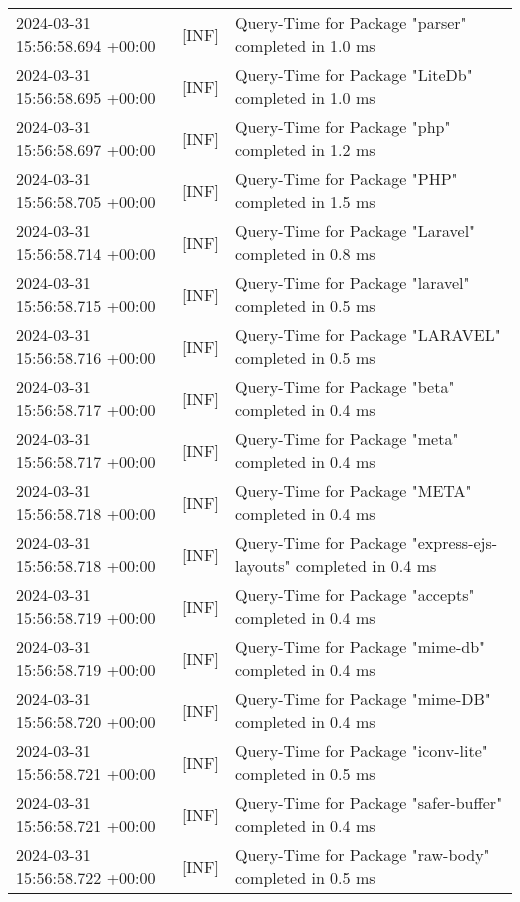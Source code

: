 {{\begin{tabularx}{\textwidth}{|l|l|X|}
                    2024-03-31 15:56:58.694 +00:00 & [INF] & Query-Time for Package "parser" completed in 1.0 ms \\
                    2024-03-31 15:56:58.695 +00:00 & [INF] & Query-Time for Package "LiteDb" completed in 1.0 ms \\
                    2024-03-31 15:56:58.697 +00:00 & [INF] & Query-Time for Package "php" completed in 1.2 ms \\
                    2024-03-31 15:56:58.705 +00:00 & [INF] & Query-Time for Package "PHP" completed in 1.5 ms \\
                    2024-03-31 15:56:58.714 +00:00 & [INF] & Query-Time for Package "Laravel" completed in 0.8 ms \\
                    2024-03-31 15:56:58.715 +00:00 & [INF] & Query-Time for Package "laravel" completed in 0.5 ms \\
                    2024-03-31 15:56:58.716 +00:00 & [INF] & Query-Time for Package "LARAVEL" completed in 0.5 ms \\
                    2024-03-31 15:56:58.717 +00:00 & [INF] & Query-Time for Package "beta" completed in 0.4 ms \\
                    2024-03-31 15:56:58.717 +00:00 & [INF] & Query-Time for Package "meta" completed in 0.4 ms \\
                    2024-03-31 15:56:58.718 +00:00 & [INF] & Query-Time for Package "META" completed in 0.4 ms \\
                    2024-03-31 15:56:58.718 +00:00 & [INF] & Query-Time for Package "express-ejs-layouts" completed in 0.4 ms \\
                    2024-03-31 15:56:58.719 +00:00 & [INF] & Query-Time for Package "accepts" completed in 0.4 ms \\
                    2024-03-31 15:56:58.719 +00:00 & [INF] & Query-Time for Package "mime-db" completed in 0.4 ms \\
                    2024-03-31 15:56:58.720 +00:00 & [INF] & Query-Time for Package "mime-DB" completed in 0.4 ms \\
                    2024-03-31 15:56:58.721 +00:00 & [INF] & Query-Time for Package "iconv-lite" completed in 0.5 ms \\
                    2024-03-31 15:56:58.721 +00:00 & [INF] & Query-Time for Package "safer-buffer" completed in 0.4 ms \\
                    2024-03-31 15:56:58.722 +00:00 & [INF] & Query-Time for Package "raw-body" completed in 0.5 ms \\

\end{tabularx}}}
